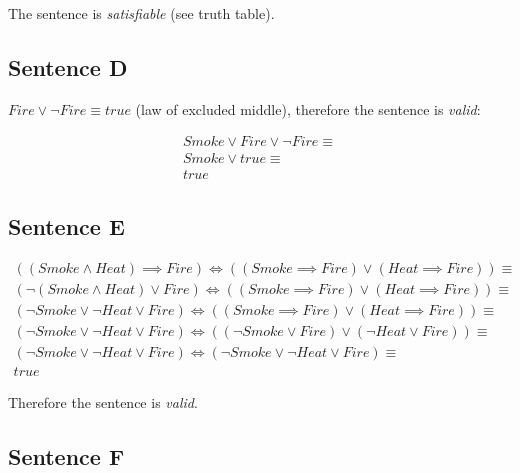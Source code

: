 The sentence is \textit{satisfiable} (see truth table).

\subsection*{Sentence D}

$Fire \lor \neg Fire \equiv true$ (law of excluded middle), therefore the sentence is \textit{valid}:

\begin{gather*}
Smoke \lor Fire \lor \neg Fire \equiv \\
Smoke \lor true \equiv \\
true
\end{gather*}

\subsection*{Sentence E}

\begin{gather*}
((Smoke \land Heat) \implies Fire) \iff ((Smoke \implies Fire) \lor (Heat \implies Fire)) \equiv \\
(\neg(Smoke \land Heat) \lor Fire) \iff ((Smoke \implies Fire) \lor (Heat \implies Fire)) \equiv \\
(\neg Smoke \lor \neg Heat \lor Fire) \iff ((Smoke \implies Fire) \lor (Heat \implies Fire)) \equiv \\
(\neg Smoke \lor \neg Heat \lor Fire) \iff ((\neg Smoke \lor Fire) \lor (\neg Heat \lor Fire)) \equiv \\
(\neg Smoke \lor \neg Heat \lor Fire) \iff (\neg Smoke \lor \neg Heat \lor Fire) \equiv \\
true
\end{gather*}

Therefore the sentence is \textit{valid}.

\subsection*{Sentence F}


